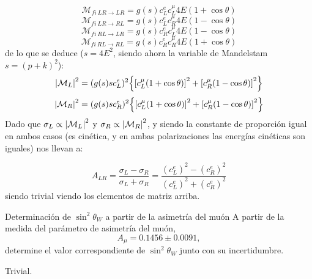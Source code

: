 \begin{equation}
	{\mathcal{M}_{fi \ LR \to LR}} = g(s)  c_L^e c_L^\mu 4E(1+\cos \theta)
\end{equation}
\begin{equation}
	{\mathcal{M}_{fi \ LR \to RL}} =  g(s)  c_L^e c_R^\mu  4E(1-\cos \theta)
\end{equation}
\begin{equation}
	{\mathcal{M}_{fi \ RL \to LR}} =  g(s)  c_R^e c_L^\mu  4E(1-\cos \theta)
\end{equation}
\begin{equation}
	{\mathcal{M}_{fi \ RL \to RL}} = g(s)  c_R^e c_R^\mu 4E(1+\cos \theta)
\end{equation}
de lo que se deduce ($s=4E^2$, siendo ahora la variable de Mandelstam $s=(p+k)^2$): 
\begin{equation}
	\vqty{\Mcal_{L}}^2 = (g(s) s c_L^e)^2 \Bqty{\bqty{c_L^\mu(1+\cos \theta)}^2 +\bqty{c_R^\mu(1-\cos \theta)}^2}
\end{equation}
\begin{equation}
	\vqty{\Mcal_{R}}^2 = (g(s) s c_R^e)^2 \Bqty{\bqty{c_L^\mu(1+\cos \theta)}^2 +\bqty{c_R^\mu(1-\cos \theta)}^2}
\end{equation}
Dado que $\sigma_L \propto \vqty{\Mcal_{L}}^2$ y $\sigma_R \propto \vqty{\Mcal_{R}}^2$, y siendo la constante de proporción igual en ambos casos (es cinética, y en ambas polarizaciones las energías cinéticas son iguales) nos llevan a: 

\begin{equation}
	A_{LR} = \frac{\sigma_L-\sigma_R}{\sigma_L+\sigma_R} = \frac{(c_L^e)^2 - (c_R^e)^2}{(c_L^e)^2 + (c_R^e)^2}
\end{equation}
siendo trivial viendo los elementos de matriz arriba. 


\begin{Ejercicio}{Determinación de $\sin^2\theta_W$ a partir de la asimetría del muón}\label{Ej:21}
A partir de la medida del parámetro de asimetría del muón, 
\[
A_\mu = 0.1456 \pm 0.0091,
\]
determine el valor correspondiente de $\sin^2\theta_W$ junto con su incertidumbre.
\end{Ejercicio}

Trivial.



